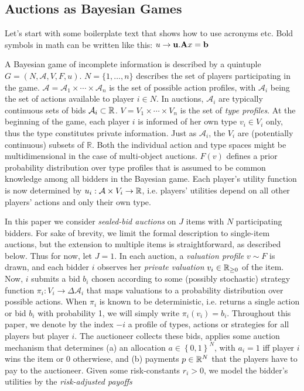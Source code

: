 \subsection{Auctions as Bayesian Games}

    Let's start with some boilerplate text that shows how to use acronyms etc. Bold symbols in math can be written like this:
    $u \rightarrow \mathbf{u}. \mathbf{A} x = \mathbf{b}$ 
  
		A Bayesian game of incomplete information is described by a quintuple $G = (N,\mathcal A, V,F,u)$. 
    $N = \{1, \dots, n\}$ describes the set of players participating in the game. $\mathcal A = \mathcal A_1 \times \cdots \times \mathcal A_n$ is the set of possible action profiles, with $\mathcal A_i$ being the set of actions available to player $i \in N$. 
    In auctions, $\mathcal{A}_i$ are typically continuous sets of bids $\mathcal{A}_i \subset \mathbb{R}$. 
    $V = V_1 \times \cdots \times V_n$ is the set of \emph{type profiles}. 
		At the beginning of the game, each player $i$ is informed of her own type $v_i\in V_i$ only, thus the type constitutes private information. 
		Just as $\mathcal A_i$, the $V_i$ are (potentially continuous) subsets of $\mathbb{R}$. 
		Both the individual action and type spaces might be multidimensional in the case of multi-object auctions. 
    $F(v)$ defines a prior probability distribution over type profiles that is assumed to be common knowledge among all bidders in the Bayesian game. Each player's utility function is now determined by $u_i: \mathcal A \times V_i \rightarrow \mathbb{R}$, i.e. players' utilities depend on all other players' actions and only their own type.

    In this paper we consider \emph{sealed-bid auctions} on $J$ items with $N$ participating bidders. For sake of brevity, we limit the formal description to single-item auctions, but the extension to multiple items is straightforward, as described below. Thus for now, let $J=1$.  In each auction, a \emph{valuation profile} $v \sim F$ is drawn, and each bidder $i$ observes her \emph{private valuation} $v_i \in \mathbb{R}_{\geq 0}$ of the item. Now, $i$ submits a bid $b_i$ chosen according to some (possibly stochastic) strategy function $\pi_i: V_i \rightarrow \Delta\mathcal A_i$ that maps valuations to a probability distribution over possible actions. When $\pi_i$ is known to be deterministic, i.e. returns a single action or bid $b_i$ with probability 1, we will simply write $\pi_i(v_i)=b_i$. Throughout this paper, we denote by the index $-i$ a profile of types, actions or strategies for all players but player $i$. The auctioneer collects these bids, applies some auction mechanism that determines (a) an allocation $a \in \left\{0,1\right\}^{N}$, with $a_{i}=1$ iff player $i$ wins the item or 0 otherwiese, and (b) payments $p\in \mathbb{R}^N$ that the players have to pay to the auctioneer. Given some risk-constants $r_i > 0$, we model the bidder's utilities by the \emph{risk-adjusted payoffs}
    
